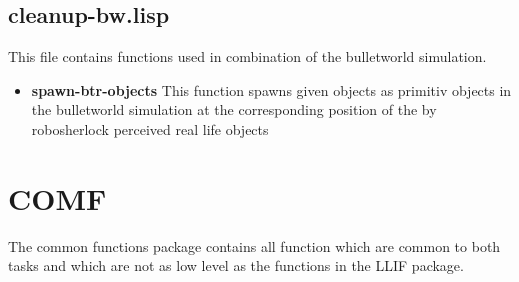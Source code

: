 \documentclass[main.tex]{subfiles}
\begin{document}
	    \subsection{cleanup-bw.lisp}
        This file contains functions used in combination of the bulletworld simulation.
		\begin{itemize}
			\item \textbf{spawn-btr-objects}
			This function spawns given objects as primitiv objects in the bulletworld simulation at the corresponding position of the by robosherlock perceived real life objects  
		\end{itemize}
	  	
	  	\section{COMF}
		The common functions package contains all function which are common to both tasks and which are not as low level as the functions in the LLIF package.
\end{document}
